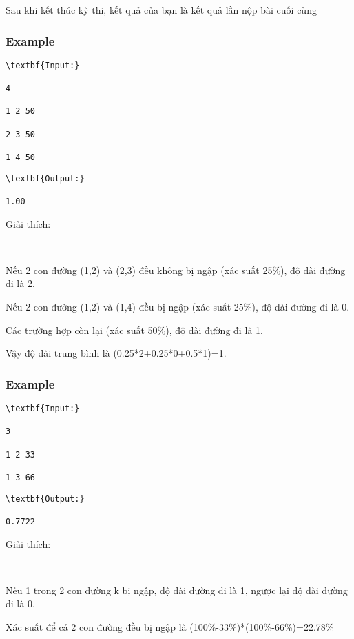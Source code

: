 Sau khi kết thúc kỳ thi, kết quả của bạn là kết quả lần nộp bài cuối cùng

\subsubsection{Example}
\begin{verbatim}
\textbf{Input:}

4

1 2 50

2 3 50

1 4 50\end{verbatim}
\begin{verbatim}
\textbf{Output:}

1.00\end{verbatim}

Giải thích:

 

Nếu 2 con đường (1,2) và (2,3) đều không bị ngập (xác suất 25\%), độ dài đường đi là 2.

Nếu 2 con đường (1,2) và (1,4) đều bị ngập (xác suất 25\%), độ dài đường đi là 0.

Các trường hợp còn lại (xác suất 50\%), độ dài đường đi là 1.

Vậy độ dài trung bình là (0.25*2+0.25*0+0.5*1)=1.

\subsubsection{Example}
\begin{verbatim}
\textbf{Input:}

3

1 2 33

1 3 66\end{verbatim}
\begin{verbatim}
\textbf{Output:}

0.7722\end{verbatim}

Giải thích:

 

Nếu 1 trong 2 con đường k bị ngập, độ dài đường đi là 1, ngược lại độ dài đường đi là 0.

Xác suất để cả 2 con đường đều bị ngập là (100\%-33\%)*(100\%-66\%)=22.78\%